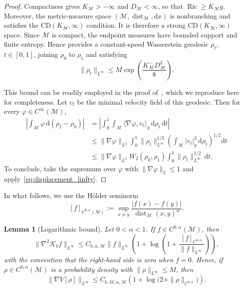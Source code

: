 \documentclass[11pt]{article}
\newtheorem{lemma}[theorem]{Lemma}
\theoremstyle{definition}
\newcommand{\Ric}{\operatorname{Ric}}
\def\K{\mathcal K}
\def\M{\mathcal M}
\def\d{\mathrm{d}}
\begin{document}
\begin{proof}
Compactness gives $K_{\M}>-\infty$ and $D_{\M}<\infty$, so that
$\Ric\geq K_{\M}g$. Moreover, the metric-measure space
$(\M,\operatorname{dist}_{\M},\d x)$ is nonbranching and satisfies the
$\mathrm{CD}(K_{\M},\infty)$ condition. It is therefore a strong
$\mathrm{CD}(K_{\M},\infty)$ space. Since $\M$ is compact, the endpoint
measures have bounded support and finite entropy. Hence
\cite[Remark~3.2, Proposition~3.3, and Eq.~(3.2)]{ambrosio2014metric}
provides a constant-speed Wasserstein geodesic
$\rho_t$, $t\in[0,1]$, joining
$\rho_0$ to $\rho_1$ and satisfying
\begin{equation}
\label{eq:displacement_linfty}
\|\rho_t\|_{L^\infty}
\leq
M\exp\!\left(\frac{K_{\M}^-D_{\M}^2}{8}\right).
\end{equation}

This bound can be readily employed in the proof of~\cite[Theorem~5]{peyre2018comparison}, which we reproduce here for completeness. 
Let $v_t$ be the minimal velocity field of this geodesic. Then
for every
$\varphi\in C^\infty(\M)$,
\begin{align*}
\left|\int_{\M}\varphi\, \d (\rho_1-\rho_0)\right|
&=
\left|\int_0^1\!\int_{\M}
\langle\nabla\varphi,v_t\rangle_g\, \d\rho_t\,\d t\right| \\
&\leq
\|\nabla\varphi\|_{L^2}
\int_0^1
\|\rho_t\|_{L^\infty}^{1/2}
\left(\int_{\M}|v_t|_g^2\, \d\rho_t\right)^{1/2}
\d t \\
&\leq
\|\nabla\varphi\|_{L^2}
W_2(\rho_0,\rho_1)
\int_0^1\|\rho_t\|_{L^\infty}^{1/2}\,\d t .
\end{align*}
To conclude, take the supremum    over $\varphi$ with
$\|\nabla\varphi\|_2\leq1$ and apply~\eqref{eq:displacement_linfty}.
\end{proof}



In what follows, we use the Hölder seminorm
\[
[f]_{C^{0,\alpha}(\M)}
:=
\sup_{x\neq y}
\frac{|f(x)-f(y)|}
{\operatorname{dist}_{\M}(x,y)^\alpha}.
\]
\begin{lemma}[Logarithmic bound]\label{lem:wellposed_log_lipschitz}
Let \(0<\alpha<1\). If \(f\in C^{0,\alpha}( \M)\), then
\begin{equation}
\label{eq:log_bound_hess}
\|\nabla^2\K_b f\|_{L^\infty}
\le
C_{b,\alpha,\M}\|f\|_{L^\infty}
\left(1+\log\left(1+\frac{[f]_{C^{0,\alpha}}}{\|f\|_{L^\infty}}\right)\right),
\end{equation}
with the convention that the right-hand side is zero when \(f=0\). Hence, if
\(\rho\in C^{0,\alpha}( \M)\) is a probability density with
\(\|\rho\|_{L^\infty}\le M\), then
\[
\|\nabla V[\rho]\|_{L^\infty}
\le
C_{b,M,\alpha,\M}\left(1+\log\bigl(2+\|\rho\|_{C^{0,\alpha}}\bigr)\right).
\]
\end{lemma}
\end{document}
